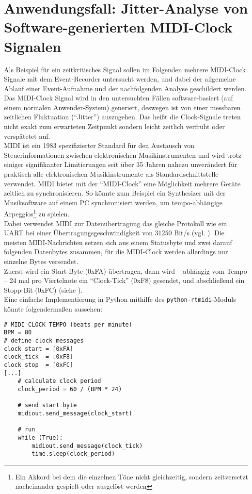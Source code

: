 \chapter{Anwendungsfall: Jitter-Analyse von Software-generierten MIDI-Clock Signalen}
\label{ch:Anwendungsfall}
Als Beispiel für ein zeitkritisches Signal sollen im Folgenden mehrere MIDI-Clock Signale mit dem Event-Recorder untersucht werden, und dabei der allgemeine Ablauf einer Event-Aufnahme und der nachfolgenden Analyse geschildert werden.
Das MIDI-Clock Signal wird in den untersuchten Fällen software-basiert (auf einem normalen Anwender-System) generiert, deswegen ist von einer messbaren zeitlichen Fluktuation (``Jitter'') auszugehen. Das heißt die Clock-Signale treten nicht exakt zum erwarteten Zeitpunkt sondern leicht zeitlich verfrüht oder verspätetet auf.\\
\acrshort{MIDI} ist ein 1983 spezifizierter Standard für den Austausch von Steuerinformationen zwischen elektronischen Musikinstrumenten und wird trotz einiger signifikanter Limitierungen seit über 35 Jahren nahezu unverändert für praktisch alle elektronischen Musikinstrumente als Standardschnittstelle verwendet. 
MIDI bietet mit der ``MIDI-Clock'' eine Möglichkeit mehrere Geräte zeitlich zu synchronisieren. So könnte zum Beispiel ein Synthesizer mit der Musiksoftware auf einem PC synchronisiert werden, um tempo-abhängige Arpeggios\footnote{Ein Akkord bei dem die einzelnen Töne nicht gleichzeitig, sondern zeitversetzt nacheinander gespielt oder ausgelöst werden} zu spielen.\\
Dabei verwendet MIDI zur Datenübertragung das gleiche Protokoll wie ein \acrshort{UART} bei einer Übertragungsgeschwindigkeit von 31250 Bit/s (vgl. \cite{wiki:MIDI}). Die meisten MIDI-Nachrichten setzen sich aus einem Statusbyte und zwei darauf folgenden Datenbytes zusammen, für die MIDI-Clock werden allerdings nur einzelne Bytes versendet. \\
Zuerst wird ein Start-Byte (0xFA) übertragen, dann wird -- abhängig vom Tempo -- 24 mal pro Viertelnote ein ``Clock-Tick'' (0xF8) gesendet, und abschließend ein Stopp-Bit (0xFC) (siehe \cite{wiki:MIDI_clock}). \\     
\clearpage
Eine einfache Implementierung in Python mithilfe des {\tt python-rtmidi}-Moduls könnte folgendermaßen aussehen:
\begin{verbatim}
# MIDI CLOCK TEMPO (beats per minute)
BPM = 80
# define clock messages
clock_start = [0xFA]
clock_tick  = [0xF8]
clock_stop  = [0xFC]
[...]
    # calculate clock period
    clock_period = 60 / (BPM * 24)

    # send start byte 
    midiout.send_message(clock_start)

    # run
    while (True):
        midiout.send_message(clock_tick)
        time.sleep(clock_period)

\end{verbatim}

